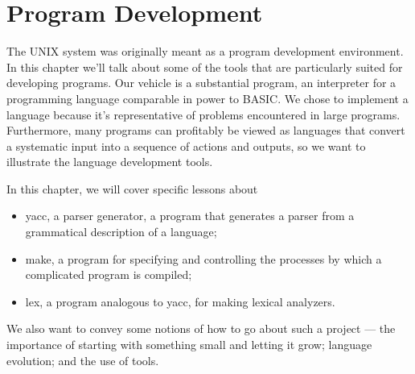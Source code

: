 \chapter{Program Development}
The UNIX system was originally meant as a program development environment. In
this chapter we'll talk about some of the tools that are particularly suited for
developing programs. Our vehicle is a substantial program, an interpreter for a
programming language comparable in power to BASIC. We chose to implement a
language because it's representative of problems encountered in large
programs. Furthermore, many programs can profitably be viewed as languages that
convert a systematic input into a sequence of actions and outputs, so we want to
illustrate the language development tools.

In this chapter, we will cover specific lessons about
\begin{itemize}
\item yacc, a parser generator, a program that generates a parser from a
  grammatical description of a language;
\item make, a program for specifying and controlling the processes by which a
  complicated program is compiled;
\item lex, a program analogous to yacc, for making lexical analyzers.
\end{itemize}
We also want to convey some notions of how to go about such a project --- the
importance of starting with something small and letting it grow; language
evolution; and the use of tools.

